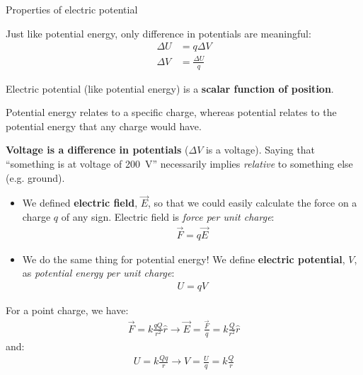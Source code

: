 \documentclass[aspectratio=169,
hyperref={colorlinks,urlcolor=blue}
]{beamer}
\begin{document}


\begin{bulletframe}{Properties of electric potential}
\item Just like potential energy, only difference in potentials are meaningful:
\begin{align*}
\Delta U &= q \Delta V\\
\Delta V &= \frac{\Delta U}{q}
\end{align*}
\item Electric potential (like potential energy) is a \textbf{scalar function of position}.
\item Potential energy relates to a specific charge, whereas potential relates to the potential energy that any charge would have.
\item \textbf{Voltage is a difference in potentials} ($\Delta V$ is a voltage). Saying that ``something is at voltage of \SI{200}{V}'' necessarily implies \textit{relative} to something else (e.g. ground). 
\end{bulletframe}







{
\begin{itemize}
\item We defined \textbf{electric field}, $\vec E$, so that we could easily calculate the force on a charge $q$ of any sign. Electric field is \textit{force per unit charge}:
\begin{align*}
\vec F = q \vec E
\end{align*}
\item We do the same thing for potential energy! We define \textbf{electric potential}, $V$, as \textit{potential energy per unit charge}:
\begin{align*}
U = q V
\end{align*}
\end{itemize}
}{
For a point charge, we have:
\begin{align*}
\vec F = k\frac{qQ}{r^2}\hat r \rightarrow \vec E = \frac{\vec F}{q}=k\frac{Q}{r^2}\hat r
\end{align*}
and:
\begin{align*}
U = k\frac{Qq}{r} \rightarrow V =\frac{U}{q}= k\frac{Q}{r}
\end{align*}
}
\end{document}
